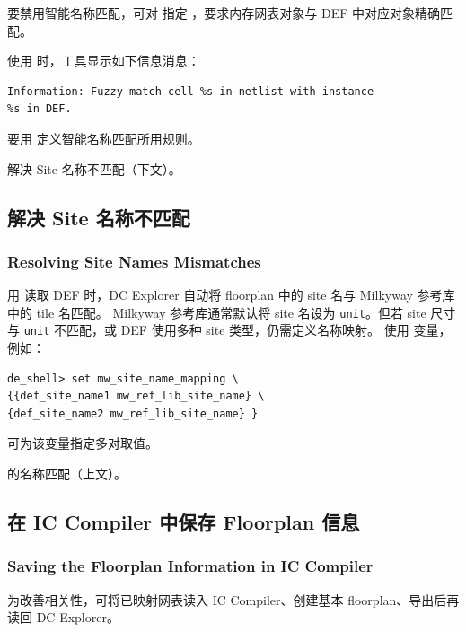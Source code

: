 要禁用智能名称匹配，可对  指定 ，要求内存网表对象与 DEF 中对应对象精确匹配。

使用  时，工具显示如下信息消息：
\begin{lstlisting}
Information: Fuzzy match cell %s in netlist with instance
%s in DEF.
\end{lstlisting}

要用  定义智能名称匹配所用规则。

\begin{seeAlsoBox}
解决 Site 名称不匹配（下文）。
\end{seeAlsoBox}

\subsection{解决 Site 名称不匹配}
\subsubsection*{Resolving Site Names Mismatches}

用  读取 DEF 时，DC Explorer 自动将 floorplan 中的 site 名与 Milkyway 参考库中的 tile 名匹配。
Milkyway 参考库通常默认将 site 名设为 \texttt{unit}。但若 site 尺寸与 \texttt{unit} 不匹配，或 DEF 使用多种 site 类型，仍需定义名称映射。
使用  变量，例如：
\begin{lstlisting}
de_shell> set mw_site_name_mapping \
{{def_site_name1 mw_ref_lib_site_name} \
{def_site_name2 mw_ref_lib_site_name} }
\end{lstlisting}

可为该变量指定多对取值。

\begin{seeAlsoBox}
 的名称匹配（上文）。
\end{seeAlsoBox}

\subsection{在 IC Compiler 中保存 Floorplan 信息}
\subsubsection*{Saving the Floorplan Information in IC Compiler}

为改善相关性，可将已映射网表读入 IC Compiler、创建基本 floorplan、导出后再读回 DC Explorer。

